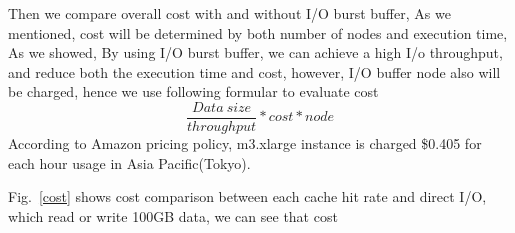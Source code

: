 Then we compare overall cost with and without I/O burst buffer, As we mentioned, cost will be determined by both number of nodes and execution time, 
As we showed, By using I/O burst buffer, we can achieve a high I/o throughput, and reduce both the execution time and cost, however, I/O buffer node also will be charged, hence we use following formular to evaluate cost
\[\frac{Data~size}{throughput}*cost*node\]
According to Amazon pricing policy, m3.xlarge instance is charged \$0.405 for each hour usage in Asia Pacific(Tokyo).

Fig.~\ref{cost} shows cost comparison between each cache hit rate and direct I/O, which read or write 100GB data, we can see that cost
